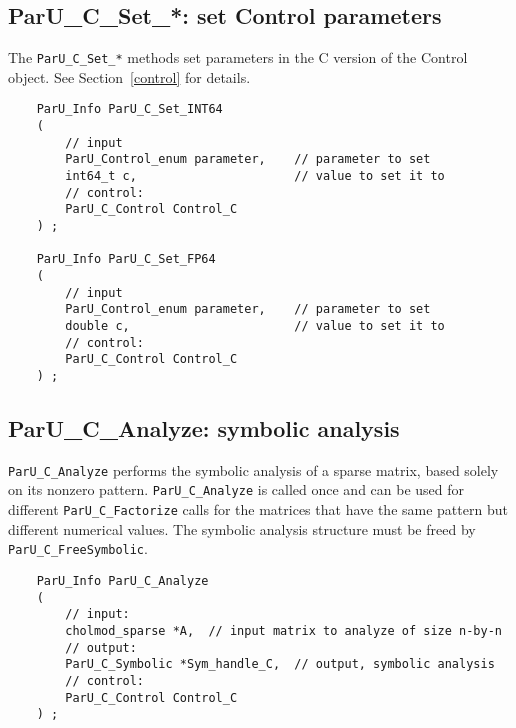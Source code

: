 \documentclass[12pt]{article}
\begin{document}
\subsection{{\sf ParU\_C\_Set\_*}: set Control parameters}

The \verb'ParU_C_Set_*' methods set parameters in the C version of the
Control object.  See Section~\ref{control} for details.

    {\footnotesize
    \begin{verbatim}
    ParU_Info ParU_C_Set_INT64
    (
        // input
        ParU_Control_enum parameter,    // parameter to set
        int64_t c,                      // value to set it to
        // control:
        ParU_C_Control Control_C
    ) ;

    ParU_Info ParU_C_Set_FP64
    (
        // input
        ParU_Control_enum parameter,    // parameter to set
        double c,                       // value to set it to
        // control:
        ParU_C_Control Control_C
    ) ; \end{verbatim} }

\subsection{{\sf ParU\_C\_Analyze}: symbolic analysis}

    \verb'ParU_C_Analyze' performs the symbolic analysis of a sparse
        matrix, based solely on its nonzero pattern.  \verb'ParU_C_Analyze' is
        called once and can be used for different \verb'ParU_C_Factorize' calls
        for the matrices that have the same pattern but different numerical
        values.  The symbolic analysis structure must be freed by
        \verb'ParU_C_FreeSymbolic'.

    {\footnotesize
    \begin{verbatim}
    ParU_Info ParU_C_Analyze
    (
        // input:
        cholmod_sparse *A,  // input matrix to analyze of size n-by-n
        // output:
        ParU_C_Symbolic *Sym_handle_C,  // output, symbolic analysis
        // control:
        ParU_C_Control Control_C
    ) ; \end{verbatim} }

\end{document}
